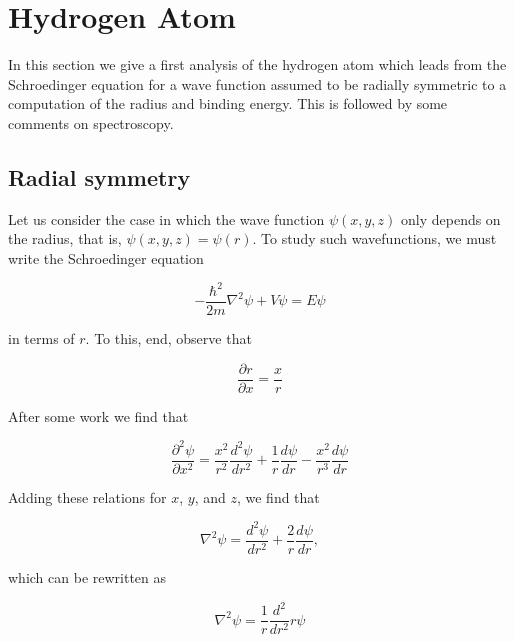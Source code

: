 
\setcounter{section}{5}




\section{Hydrogen Atom}

\innertableofcontents

In this section we give a first analysis of the hydrogen atom which leads from the Schroedinger equation for a wave function assumed to be radially symmetric to a computation of the radius and binding energy.  This is followed by some comments on spectroscopy.

\subsection{Radial symmetry}



Let us consider the case in which the wave function $\psi(x,y,z)$ only depends on the radius, that is,
$\psi(x,y,z) = \psi(r)$.  To study such wavefunctions,
we must write the Schroedinger equation

\begin{equation}
-\frac{\hbar^2 }{2m} \nabla^2 \psi  + V\psi = E\psi
\end{equation}

in terms of $r$.  To this, end, observe that

\begin{equation}
\frac{\partial r}{\partial x} = \frac{x}{r}
\end{equation}

After some work we find that

\begin{equation}
\frac{\partial^2\psi}{ \partial x^2}
 = \frac{ x^2 }{ r^2 }\frac{ d^2\psi }{ dr^2 }
   + \frac{1}{r}\frac{d\psi}{dr} - \frac{ x^2 }{ r^3 }\frac{d\psi}{dr}
\end{equation}

Adding these relations for $x$, $y$, and $z$, we find that

\begin{equation}
\nabla^2 \psi = \frac{ d^2\psi  }{ dr^2 }+ \frac{2}{r}\frac{d\psi}{dr} ,
\end{equation}

which can be rewritten as

\begin{equation}
\nabla^2 \psi = \frac{1}{r}\frac{ d^2 }{ dr^2 }r\psi
\end{equation}

